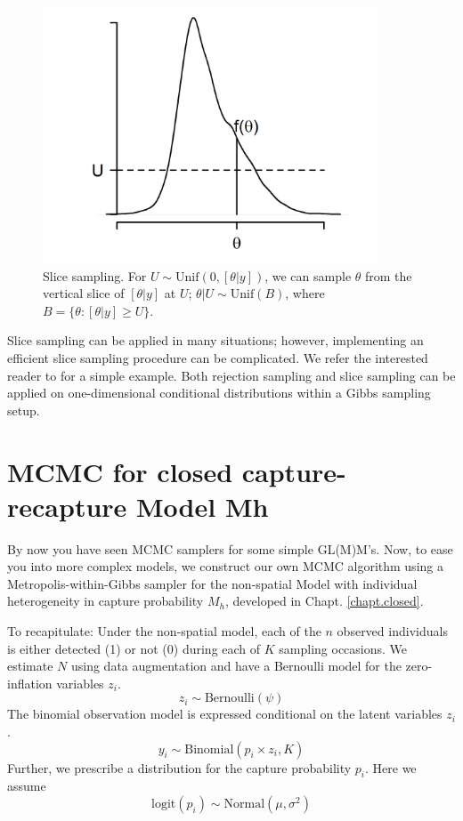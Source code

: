 \begin{figure}
\begin{center}
\includegraphics[height=3in]{Ch7/figs/slicesampling}
\end{center}
\caption{
Slice sampling. For 
$U \sim \mbox{Unif}(0, [\theta|y])$, 
we can sample $\theta$ from the vertical slice of $[\theta|y]$ at $U$; 
$\theta|U \sim \mbox{Unif}(B)$, 
where $B = \{ \theta: [\theta|y] \geq U\}$.
}
\label{mcmc.fig.slicesample}
\end{figure}


Slice sampling can be applied in many situations; however,
implementing an efficient slice sampling procedure can be
complicated. We refer the interested reader to 
\citet[][Chapt. 7]{robert_casella:2010} for a simple example.  Both rejection
sampling and slice sampling can be applied on one-dimensional
conditional distributions within a Gibbs sampling setup.

\section{MCMC for closed capture-recapture Model Mh}

By now you have seen MCMC samplers for some simple GL(M)M's. Now, to
ease you into more complex models, we construct our own MCMC algorithm
using a Metropolis-within-Gibbs sampler for the non-spatial Model with
individual heterogeneity in capture probability $M_{h}$, developed in
Chapt. \ref{chapt.closed}.

To recapitulate: Under the non-spatial model, each of the $n$ observed
individuals is either detected (1) or not (0) during each of $K$
sampling occasions. We estimate $N$ using data augmentation and have a
Bernoulli model for the zero-inflation variables $z_{i}$. 
\[
z_{i} \sim \mbox{Bernoulli}(\psi)
\]
The binomial
observation model is expressed conditional on the latent variables
$z_{i}$. 
\[
y_i \sim \mbox{Binomial} (p_i \times z_i, K)
\]
Further, we prescribe a distribution for the capture
probability $p_{i}$. Here we assume
\[
\mathrm{logit}(p_{i}) \sim \mbox{Normal}(\mu,\sigma^2)
\]

